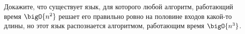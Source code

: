 Докажите, что существует язык, для которого любой алгоритм, работающий время $\bigO{n^2}$ решает его
правильно ровно на половине входов какой-то длины, но этот язык распознается алгоритмом, работающим время
$\bigO{n^3}$.
